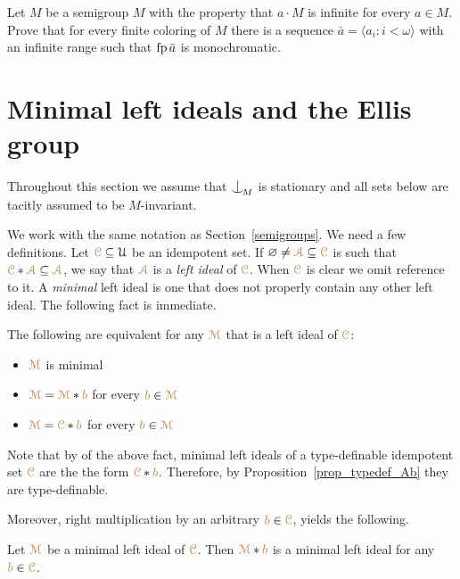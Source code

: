 \begin{exercise}
  Let $M$ be a semigroup $M$ with the property that $a\cdot M$ is infinite for every $a\in M$.
  Prove that for every finite coloring of $M$ 
  there is a sequence $\bar a=\langle a_i:i<\omega\rangle$ with an infinite range such that ${\rm fp}\,\bar a$ is monochromatic.
\end{exercise}



\section{Minimal left ideals and the Ellis group}
\label{Ellis_group}

Throughout this section we assume that $\nonfork_{\!M}$ is stationary and all sets below are tacitly assumed to be $M$-invariant.

We work with the same notation as Section~\ref{semigroups}.
We need a few definitions.
Let ${\color{brown}\EuScript C}\subseteq\EuScript U$ be an idempotent set.
If $\varnothing\neq{\color{brown}\EuScript A}\subseteq{\color{brown}\EuScript C}$ is such that ${\color{brown}\EuScript C}*{\color{brown}\EuScript A}\subseteq{\color{brown}\EuScript A}$, we say that ${\color{brown}\EuScript A}$ is a \emph{left ideal\/} of ${\color{brown}\EuScript C}$.
When ${\color{brown}\EuScript C}$ is clear we omit reference to it.
A \emph{minimal\/} left ideal is one that does not properly contain any other left ideal.
The following fact is immediate.

\begin{fact}\label{fact_mli}
  The following are equivalent for any ${\color{brown}\EuScript M}$ that is a left ideal of ${\color{brown}\EuScript C}$:
  \begin{itemize}
    \item [1.] ${\color{brown}\EuScript M}$ is minimal
    \item [2.] ${\color{brown}\EuScript M}={\color{brown}\EuScript M}*{\color{brown} b}$ for every ${\color{brown} b}\in{\color{brown}\EuScript M}$
    \item [3.] ${\color{brown}\EuScript M}={\color{brown}\EuScript C}*{\color{brown} b}$ for every ${\color{brown} b}\in{\color{brown}\EuScript M}$
  \end{itemize}
\end{fact}

Note that by  of the above fact, minimal left ideals of a type-definable idempotent set ${\color{brown}\EuScript C}$ are the the form ${\color{brown}\EuScript C}*{\color{brown} b}$.
Therefore, by Proposition~\ref{prop_typedef_Ab} they are type-definable.

Moreover, right multiplication by an arbitrary ${\color{brown} b}\in{\color{brown}\EuScript C}$, yields the following.

\begin{fact}\label{fact_mli2}
   Let ${\color{brown}\EuScript M}$ be a minimal left ideal of ${\color{brown}\EuScript C}$.
   Then ${\color{brown}\EuScript M}*{\color{brown} b}$ is a minimal left ideal for any ${\color{brown} b}\in{\color{brown}\EuScript C}$.
\end{fact}

